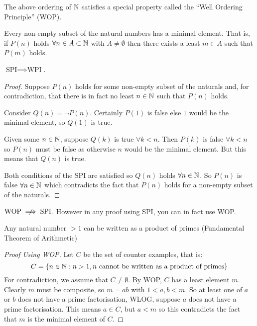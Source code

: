 \documentclass[../main.tex]{subfiles}
\begin{document}
The above ordering of $\mathbb{N}$ satisfies a special property called the ``Well Ordering Principle'' (WOP).
\begin{definition}
  Every non-empty subset of the natural numbers has a minimal element.
  That is, if $P(n)$ holds $\forall n \in  A \subset \mathbb{N}$ with $A \neq \emptyset$ then there exists a least $m \in A$ such that $P(m)$ holds.
\end{definition}
\begin{theorem}
  $\text{SPI} \implies \text{WPI}$.
\end{theorem}
\begin{proof}
  Suppose $P(n)$ holds for some non-empty subset of the naturals and, for contradiction, that there is in fact no least $n \in \mathbb{N}$ such that $P(n)$ holds.

  Consider $Q(n) = \lnot P(n)$.
  Certainly $P(1)$ is false else $1$ would be the minimal element, so $Q(1)$ is true.

  Given some $n \in \mathbb{N}$, suppose $Q(k)$ is true $\forall k < n$.
  Then $P(k)$ is false $\forall k < n$ so $P(n)$ must be false as otherwise $n$ would be the minimal element.
  But this means that $Q(n)$ is true.

  Both conditions of the SPI are satisfied so $Q(n)$ holds $\forall n \in \mathbb{N}$.
  So $P(n)$ is false $\forall n \in \mathbb{N}$ which contradicts the fact that $P(n)$ holds for a non-empty subset of the naturals.
\end{proof}
\begin{remark}
  $\text{WOP} \centernot\implies \text{SPI}$.
  However in any proof using SPI, you can in fact use WOP.
\end{remark}
\begin{example}
  Any natural number $>1$ can be written as a product of primes (Fundamental Theorem of Arithmetic)
\end{example}
\begin{proof}[Proof Using WOP]
  Let $C$ be the set of counter examples, that is:
  \[
    C = \{n \in \mathbb{N}: n > 1, n \text{ cannot be written as a product of primes}\}
  \]
  For contradiction, we assume that $C \neq \emptyset$.
  By WOP, $C$ has a least element $m$.
  Clearly $m$ must be composite, so $m = ab$ with $1 < a, b < m$.
  So at least one of $a$ or $b$ does not have a prime factorisation, WLOG, suppose $a$ does not have a prime factorisation.
  This means $a \in C$, but $a < m$ so this contradicts the fact that $m$ is the minimal element of $C$.
\end{proof}
\end{document}
